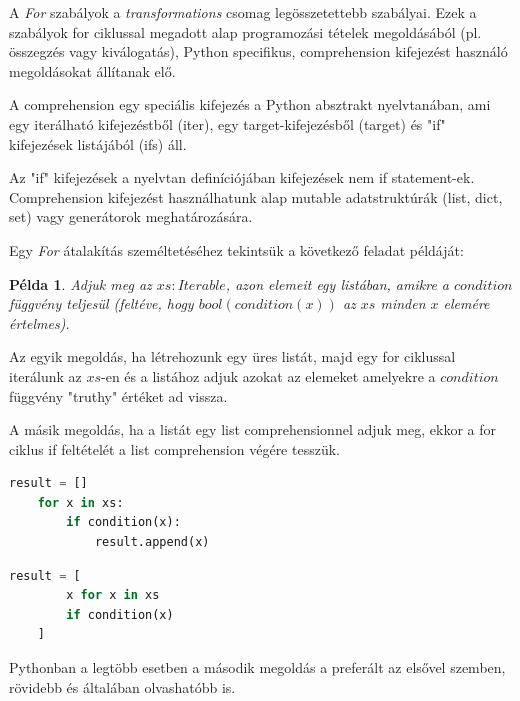 A \emph{For} szabályok a \emph{transformations} csomag legösszetettebb szabályai.
Ezek a szabályok for ciklussal megadott alap programozási tételek megoldásából
(pl. összegzés vagy kiválogatás), Python specifikus, comprehension kifejezést használó
megoldásokat állítanak elő.

A comprehension egy speciális kifejezés a Python absztrakt nyelvtanában, ami
egy iterálható kifejezéstből (iter), egy target-kifejezésből (target)
és "if" kifejezések listájából (ifs) áll.

Az "if" kifejezések a nyelvtan definíciójában kifejezések nem if statement-ek.
Comprehension kifejezést használhatunk alap
mutable adatstruktúrák (list, dict, set) vagy generátorok meghatározására.

Egy \emph{For} átalakítás személtetéséhez tekintsük a következő feladat példáját:

\newtheorem{example}{Példa}
\begin{example}
Adjuk meg az $xs: Iterable$, azon elemeit egy listában,
amikre a $condition$ függvény teljesül
(feltéve, hogy $bool(condition(x))$ az $xs$ minden $x$ elemére értelmes).
\end{example}

Az egyik megoldás, ha létrehozunk egy üres listát,
majd egy for ciklussal iterálunk az $xs$-en és
a listához adjuk azokat az elemeket amelyekre a $condition$ függvény
"truthy" értéket ad vissza.

A másik megoldás, ha a listát egy list comprehensionnel adjuk meg,
ekkor a for ciklus if feltételét a list comprehension végére tesszük.

\noindent
\begin{minipage}[t]{.48\textwidth}
\begin{lstlisting}[language={Python}]
	result = []
	for x in xs:
		if condition(x):
			result.append(x)
\end{lstlisting}
\end{minipage}
\hfill
\begin{minipage}[t]{.48\textwidth}
\begin{lstlisting}[language={Python}]
	result = [
		x for x in xs
		if condition(x)
	]
\end{lstlisting}
\end{minipage}

Pythonban a legtöbb esetben a második megoldás a preferált az elsővel szemben,
rövidebb és általában olvashatóbb is.

